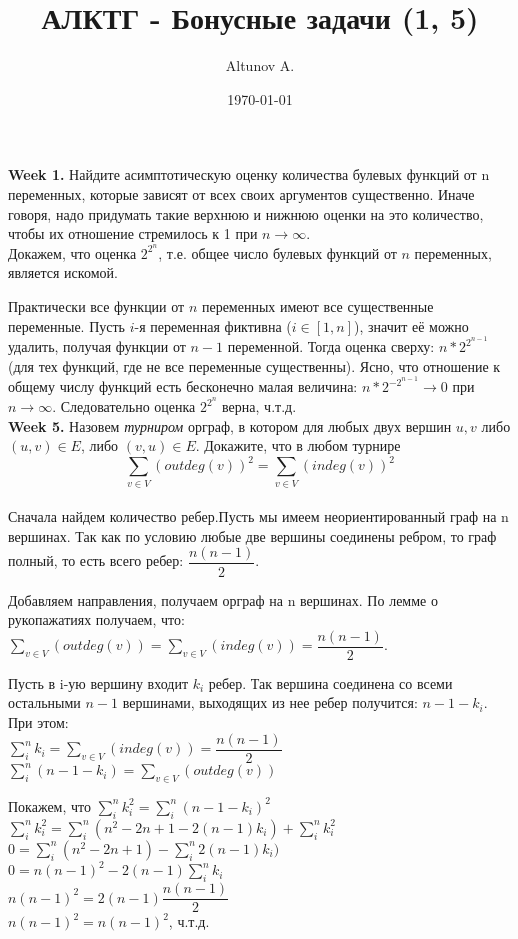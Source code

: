 \documentclass[a4paper,12pt]{article}
\author{Altunov A.}
\title{АЛКТГ - Бонусные задачи (1, 5)}
\date{\today}
\begin{document}
\maketitle
\newpage
\textbf{Week 1.} Найдите асимптотическую оценку количества булевых функций от n переменных, которые зависят от всех своих аргументов существенно. Иначе говоря, надо придумать такие верхнюю и нижнюю оценки на это количество, чтобы их отношение стремилось к 1 при $ n \rightarrow \infty $.
\\

Докажем, что оценка $2^{2^n}$, т.е. общее число булевых функций от $n$ переменных, является искомой.

Практически все функции от $n$ переменных имеют все существенные переменные. Пусть $i$-я переменная фиктивна ($i \in [1,n]$), значит её можно удалить, получая функции от $n-1$ переменной. Тогда оценка сверху: $n*2^{2^{n-1}}$ (для тех функций, где не все переменные существенны). Ясно, что отношение к общему числу функций есть бесконечно малая величина: $n*2^{-2^{n-1}} \rightarrow 0$ при $ n \rightarrow \infty $. Следовательно оценка $2^{2^n}$ верна, ч.т.д.
\\

\textbf{Week 5.} Назовем \textit{турниром} орграф, в котором для любых двух вершин $u,v$ либо $(u,v) \in E$, либо $ (v,u) \in E $. Докажите, что в любом турнире
\begin{equation}
\sum\limits_{v \in V} (outdeg(v))^2 = \sum\limits_{v \in V} (indeg(v))^2
\end{equation}
\\

Сначала найдем количество ребер.Пусть мы имеем неориентированный граф на n вершинах. Так как по условию любые две вершины соединены ребром, то граф полный, то есть всего ребер: $ \dfrac{n(n-1)}{2} $.

Добавляем направления, получаем орграф на n вершинах. По лемме о рукопажатиях получаем, что: $ \sum\limits_{v \in V} (outdeg(v)) = \sum\limits_{v \in V} (indeg(v)) = \dfrac{n(n-1)}{2} $.

Пусть в i-ую вершину входит $k_i$ ребер. Так вершина соединена со всеми остальными $n-1$ вершинами, выходящих из нее ребер получится: $ n-1-k_i $. 
\\
При этом: 
\\
$\sum\limits_i^n k_i = \sum\limits_{v \in V} (indeg(v)) = \dfrac{n(n-1)}{2}$ 
\\
$\sum\limits_i^n (n-1-k_i) = \sum\limits_{v \in V} (outdeg(v))$

Покажем, что $\sum\limits_i^n k_i^2 = \sum\limits_i^n (n-1-k_i)^2$
\\
$\sum\limits_i^n k_i^2 = \sum\limits_i^n (n^2-2n+1-2(n-1)k_i) + \sum\limits_i^n k_i^2$
\\
$0 = \sum\limits_i^n (n^2-2n+1) - \sum\limits_i^n 2(n-1)k_i)$
\\
$0 = n(n-1)^2 - 2(n-1)\sum\limits_i^n k_i$
\\
$n(n-1)^2 = 2(n-1)\dfrac{n(n-1)}{2}$
\\
$n(n-1)^2 = n(n-1)^2$, ч.т.д.
\end{document}
